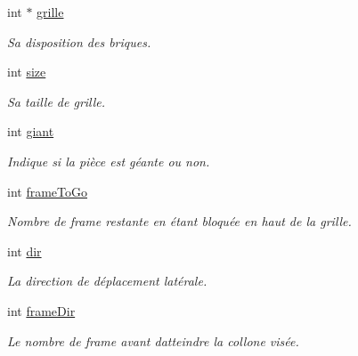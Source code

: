 \begin{DoxyCompactItemize}
\mbox{\label{structPiece_a53c275753c38008d97f9f1bb5a002ab0}} 
int $\ast$ \hyperlink{structPiece_a53c275753c38008d97f9f1bb5a002ab0}{grille}
\begin{DoxyCompactList}\small\item\em Sa disposition des briques. \end{DoxyCompactList}\item 
\mbox{\label{structPiece_a439227feff9d7f55384e8780cfc2eb82}} 
int \hyperlink{structPiece_a439227feff9d7f55384e8780cfc2eb82}{size}
\begin{DoxyCompactList}\small\item\em Sa taille de grille. \end{DoxyCompactList}\item 
\mbox{\label{structPiece_ace00c818a42e075e4b95fb8c0e76ef68}} 
int \hyperlink{structPiece_ace00c818a42e075e4b95fb8c0e76ef68}{giant}
\begin{DoxyCompactList}\small\item\em Indique si la pièce est géante ou non. \end{DoxyCompactList}\item 
\mbox{\label{structPiece_a1a0ea235a379f8a01e7ca7af7d70db65}} 
int \hyperlink{structPiece_a1a0ea235a379f8a01e7ca7af7d70db65}{frame\+To\+Go}
\begin{DoxyCompactList}\small\item\em Nombre de frame restante en étant bloquée en haut de la grille. \end{DoxyCompactList}\item 
\mbox{\label{structPiece_a851cf68c8f607573c1a5e987784c83f6}} 
int \hyperlink{structPiece_a851cf68c8f607573c1a5e987784c83f6}{dir}
\begin{DoxyCompactList}\small\item\em La direction de déplacement latérale. \end{DoxyCompactList}\item 
\mbox{\label{structPiece_af88e9b6e7a4389bb550446ec43f5f217}} 
int \hyperlink{structPiece_af88e9b6e7a4389bb550446ec43f5f217}{frame\+Dir}
\begin{DoxyCompactList}\small\item\em Le nombre de frame avant d\textquotesingle{}atteindre la collone visée. \end{DoxyCompactList}\item 

\end{DoxyCompactItemize}
